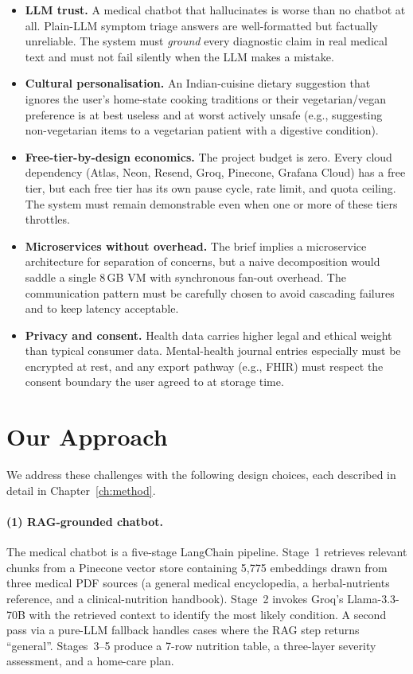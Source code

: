 \documentclass[12pt]{caltech_thesis}
\begin{document}
\begin{itemize}
    \item \textbf{LLM trust.} A medical chatbot that hallucinates is worse
    than no chatbot at all. Plain-LLM symptom triage answers are
    well-formatted but factually unreliable. The system must \textit{ground}
    every diagnostic claim in real medical text and must not fail
    silently when the LLM makes a mistake.
    \item \textbf{Cultural personalisation.} An Indian-cuisine dietary
    suggestion that ignores the user's home-state cooking traditions or
    their vegetarian/vegan preference is at best useless and at worst
    actively unsafe (e.g., suggesting non-vegetarian items to a vegetarian
    patient with a digestive condition).
    \item \textbf{Free-tier-by-design economics.} The project budget is
    zero. Every cloud dependency (Atlas, Neon, Resend, Groq, Pinecone,
    Grafana Cloud) has a free tier, but each free tier has its own pause
    cycle, rate limit, and quota ceiling. The system must remain
    demonstrable even when one or more of these tiers throttles.
    \item \textbf{Microservices without overhead.} The brief implies a
    microservice architecture for separation of concerns, but a naive
    decomposition would saddle a single 8\,GB VM with synchronous fan-out
    overhead. The communication pattern must be carefully chosen to avoid
    cascading failures and to keep latency acceptable.
    \item \textbf{Privacy and consent.} Health data carries higher legal
    and ethical weight than typical consumer data. Mental-health journal
    entries especially must be encrypted at rest, and any export pathway
    (e.g., FHIR) must respect the consent boundary the user agreed to at
    storage time.
\end{itemize}

\section{Our Approach}

We address these challenges with the following design choices, each
described in detail in Chapter~\ref{ch:method}.

\paragraph{(1) RAG-grounded chatbot.} The medical chatbot is a five-stage
LangChain pipeline. Stage~1 retrieves relevant chunks from a Pinecone
vector store containing 5{,}775 embeddings drawn from three medical PDF
sources (a general medical encyclopedia, a herbal-nutrients reference, and a
clinical-nutrition handbook). Stage~2 invokes Groq's Llama-3.3-70B with the
retrieved context to identify the most likely condition. A second pass via
a pure-LLM fallback handles cases where the RAG step returns ``general''.
Stages~3--5 produce a 7-row nutrition table, a three-layer severity
assessment, and a home-care plan.
\end{document}
